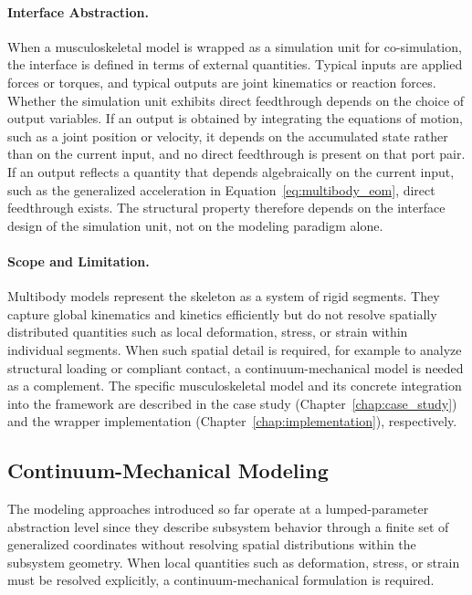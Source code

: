 \paragraph{Interface Abstraction.}
When a musculoskeletal model is wrapped as a simulation unit for co-simulation, the interface is defined in terms of external quantities.
Typical inputs are applied forces or torques, and typical outputs are joint kinematics or reaction forces.
Whether the simulation unit exhibits direct feedthrough depends on the choice of output variables.
If an output is obtained by integrating the equations of motion, such as a joint position or velocity, it depends on the accumulated state rather than on the current input, and no direct feedthrough is present on that port pair.
If an output reflects a quantity that depends algebraically on the current input, such as the generalized acceleration in Equation~\eqref{eq:multibody_eom}, direct feedthrough exists.
The structural property therefore depends on the interface design of the simulation unit, not on the modeling paradigm alone.


\paragraph{Scope and Limitation.}
Multibody models represent the skeleton as a system of rigid segments.
They capture global kinematics and kinetics efficiently but do not resolve spatially distributed quantities such as local deformation, stress, or strain within individual segments.
When such spatial detail is required, for example to analyze structural loading or compliant contact, a continuum-mechanical model is needed as a complement.
The specific musculoskeletal model and its concrete integration into the framework are described in the case study (Chapter~\ref{chap:case_study}) and the wrapper implementation (Chapter~\ref{chap:implementation}), respectively.

\subsection{Continuum-Mechanical Modeling}
\label{sec:modeling_continuum}

The modeling approaches introduced so far operate at a lumped-parameter abstraction level since they describe subsystem behavior through a finite set of generalized coordinates without resolving spatial distributions within the subsystem geometry.
When local quantities such as deformation, stress, or strain must be resolved explicitly, a continuum-mechanical formulation is required.

